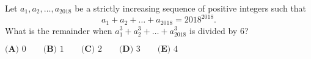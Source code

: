Let $a_1,a_2,\ldots,a_{2018}$ be a strictly increasing sequence of positive integers such that \[a_1+a_2+\ldots+a_{2018}=2018^{2018}.\] What is the remainder when $a_1^3+a_2^3+\ldots+a_{2018}^3$ is divided by $6$?

$\textbf{(A) }0\qquad\textbf{(B) }1\qquad\textbf{(C) }2\qquad\textbf{(D) }3\qquad\textbf{(E) }4$
